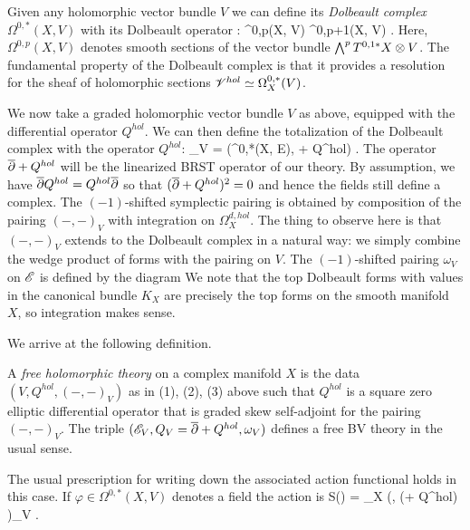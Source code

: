\documentclass[10pt]{article}
\begin{document}
Given any holomorphic vector bundle $V$ we can define its {\em Dolbeault complex} $\Omega^{0,*}(X , V)$ with its Dolbeault operator 
\ben
\dbar : \Omega^{0,p}(X, V) \to \Omega^{0,p+1}(X, V) .
\een
Here, $\Omega^{0,p}(X, V)$ denotes smooth sections of the vector bundle $\bigwedge^p T^{0,1*} X \otimes V$. 
The fundamental property of the Dolbeault complex is that it provides a resolution for the sheaf of holomorphic sections $\mathscr V^{hol} \simeq \Omega^{0,*}_X(V)$. 

We now take a graded holomorphic vector bundle $V$ as above, equipped with the differential operator $Q^{hol}$. 
We can then define the totalization of the Dolbeault complex with the operator $Q^{hol}$:
\ben
\sE_V = \left(\Omega^{0,*}(X, E), \dbar + Q^{hol}\right) .
\een
The operator $\overline{\partial} + Q^{hol}$ will be the linearized BRST operator of our theory.
By assumption, we have $\overline{\partial} Q^{hol} = Q^{hol} \overline{\partial}$ so that $(\overline{\partial} + Q^{hol})^2 = 0$ and hence the fields still define a complex. 
The $(-1)$-shifted symplectic pairing is obtained by composition of the pairing $(-,-)_V$ with integration on $\Omega^{d,hol}_X$. 
The thing to observe here is that $(-,-)_V$ extends to the Dolbeault complex in a natural way: we simply combine the wedge product of forms with the pairing on $V$.
The $(-1)$-shifted pairing $\omega_V$ on $\mathscr E$ is defined by the diagram
\ben
{}
\een
We note that the top Dolbeault forms with values in the canonical bundle $K_X$ are precisely the top forms on the smooth manifold $X$, so integration makes sense. 

We arrive at the following definition. 

\begin{dfn/lem}\label{dfn hol free theory}
A {\em free holomorphic theory} on a complex manifold $X$ is the data $(V, Q^{hol}, (-,-)_V)$ as in (1), (2), (3) above such that $Q^{hol}$ is a square zero elliptic differential operator that is graded skew self-adjoint for the pairing $(-,-)_V$.
The triple $(\mathscr E_V, Q_V = \overline{\partial} + Q^{hol}, \omega_V)$ defines a free BV theory in the usual sense.
\end{dfn/lem}

The usual prescription for writing down the associated action functional holds in this case.
If $\varphi \in \Omega^{0,*}(X , V)$ denotes a field the action is
\ben
S(\varphi) = \int_X \left(\varphi, (\dbar + Q^{hol}) \varphi \right)_V .
\een
\end{document}
